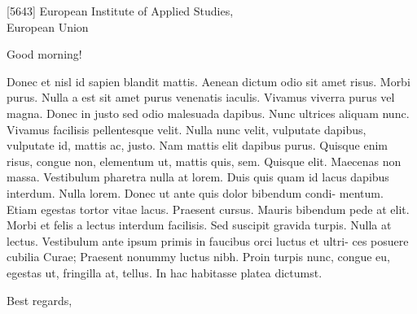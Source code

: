 \documentclass[english]{kthletter}
\date{Stockholm, \today}
\begin{document}
\begin{letter}[5643]%
  {European Institute of Applied Studies,\\%
  European Union}
\opening{Good morning!}

Donec et nisl id sapien blandit mattis. Aenean dictum odio sit amet risus. Morbi
purus. Nulla a est sit amet purus venenatis iaculis. Vivamus viverra purus vel
magna. Donec in justo sed odio malesuada dapibus. Nunc ultrices aliquam
nunc. Vivamus facilisis pellentesque velit. Nulla nunc velit, vulputate dapibus,
vulputate id, mattis ac, justo. Nam mattis elit dapibus purus. Quisque enim risus,
congue non, elementum ut, mattis quis, sem. Quisque elit.
Maecenas non massa. Vestibulum pharetra nulla at lorem. Duis quis quam id
lacus dapibus interdum. Nulla lorem. Donec ut ante quis dolor bibendum condi-
mentum. Etiam egestas tortor vitae lacus. Praesent cursus. Mauris bibendum
pede at elit. Morbi et felis a lectus interdum facilisis. Sed suscipit gravida turpis.
Nulla at lectus. Vestibulum ante ipsum primis in faucibus orci luctus et ultri-
ces posuere cubilia Curae; Praesent nonummy luctus nibh. Proin turpis nunc,
congue eu, egestas ut, fringilla at, tellus. In hac habitasse platea dictumst.

\closing{Best regards,}



\end{letter}
\end{document}
